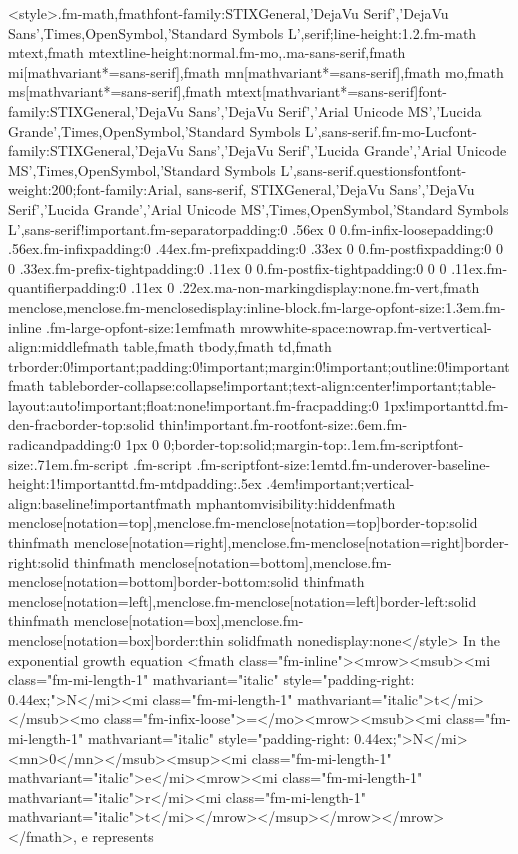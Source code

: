 \documentclass{article}
\begin{document}
<style>.fm-math,fmath{font-family:STIXGeneral,'DejaVu Serif','DejaVu Sans',Times,OpenSymbol,'Standard Symbols L',serif;line-height:1.2}.fm-math mtext,fmath mtext{line-height:normal}.fm-mo,.ma-sans-serif,fmath mi[mathvariant*=sans-serif],fmath mn[mathvariant*=sans-serif],fmath mo,fmath ms[mathvariant*=sans-serif],fmath mtext[mathvariant*=sans-serif]{font-family:STIXGeneral,'DejaVu Sans','DejaVu Serif','Arial Unicode MS','Lucida Grande',Times,OpenSymbol,'Standard Symbols L',sans-serif}.fm-mo-Luc{font-family:STIXGeneral,'DejaVu Sans','DejaVu Serif','Lucida Grande','Arial Unicode MS',Times,OpenSymbol,'Standard Symbols L',sans-serif}.questionsfont{font-weight:200;font-family:Arial, sans-serif, STIXGeneral,'DejaVu Sans','DejaVu Serif','Lucida Grande','Arial Unicode MS',Times,OpenSymbol,'Standard Symbols L',sans-serif!important}.fm-separator{padding:0 .56ex 0 0}.fm-infix-loose{padding:0 .56ex}.fm-infix{padding:0 .44ex}.fm-prefix{padding:0 .33ex 0 0}.fm-postfix{padding:0 0 0 .33ex}.fm-prefix-tight{padding:0 .11ex 0 0}.fm-postfix-tight{padding:0 0 0 .11ex}.fm-quantifier{padding:0 .11ex 0 .22ex}.ma-non-marking{display:none}.fm-vert,fmath menclose,menclose.fm-menclose{display:inline-block}.fm-large-op{font-size:1.3em}.fm-inline .fm-large-op{font-size:1em}fmath mrow{white-space:nowrap}.fm-vert{vertical-align:middle}fmath table,fmath tbody,fmath td,fmath tr{border:0!important;padding:0!important;margin:0!important;outline:0!important}fmath table{border-collapse:collapse!important;text-align:center!important;table-layout:auto!important;float:none!important}.fm-frac{padding:0 1px!important}td.fm-den-frac{border-top:solid thin!important}.fm-root{font-size:.6em}.fm-radicand{padding:0 1px 0 0;border-top:solid;margin-top:.1em}.fm-script{font-size:.71em}.fm-script .fm-script .fm-script{font-size:1em}td.fm-underover-base{line-height:1!important}td.fm-mtd{padding:.5ex .4em!important;vertical-align:baseline!important}fmath mphantom{visibility:hidden}fmath menclose[notation=top],menclose.fm-menclose[notation=top]{border-top:solid thin}fmath menclose[notation=right],menclose.fm-menclose[notation=right]{border-right:solid thin}fmath menclose[notation=bottom],menclose.fm-menclose[notation=bottom]{border-bottom:solid thin}fmath menclose[notation=left],menclose.fm-menclose[notation=left]{border-left:solid thin}fmath menclose[notation=box],menclose.fm-menclose[notation=box]{border:thin solid}fmath none{display:none}</style> In the exponential growth equation \newline <fmath class="fm-inline"><mrow><msub><mi class="fm-mi-length-1" mathvariant="italic" style="padding-right: 0.44ex;">N</mi><mi class="fm-mi-length-1" mathvariant="italic">t</mi></msub><mo class="fm-infix-loose">=</mo><mrow><msub><mi class="fm-mi-length-1" mathvariant="italic" style="padding-right: 0.44ex;">N</mi><mn>0</mn></msub><msup><mi class="fm-mi-length-1" mathvariant="italic">e</mi><mrow><mi class="fm-mi-length-1" mathvariant="italic">r</mi><mi class="fm-mi-length-1" mathvariant="italic">t</mi></mrow></msup></mrow></mrow></fmath>, e represents
\end{document}
